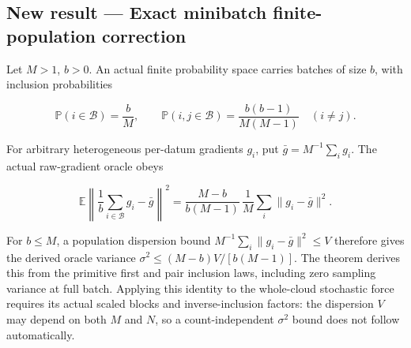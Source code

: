 \documentclass[11pt,a4paper]{report}
\begin{document}
\subsection{\texorpdfstring{New result — Exact minibatch finite-population correction}{New result — Exact minibatch finite-population correction}}



Let \(M>1\), \(b>0\). An actual finite probability space carries batches of size \(b\), with inclusion probabilities



\[\mathbb P(i\in\mathcal B)=\frac bM,\qquad\mathbb P(i,j\in\mathcal B)=\frac{b(b-1)}{M(M-1)}\quad(i\ne j).\]



For arbitrary heterogeneous per-datum gradients \(g_i\), put \(\bar g=M^{-1}\sum_i g_i\). The actual raw-gradient oracle obeys



\[\mathbb E\left\|\frac1b\sum_{i\in\mathcal B}g_i-\bar g\right\|^2=\frac{M-b}{b(M-1)}\,\frac1M\sum_i\|g_i-\bar g\|^2.\]



For \(b\le M\), a population dispersion bound \(M^{-1}\sum_i\|g_i-\bar g\|^2\le V\) therefore gives the derived oracle variance \(\sigma^2\le (M-b)V/[b(M-1)]\). The theorem derives this from the primitive first and pair inclusion laws, including zero sampling variance at full batch. Applying this identity to the whole-cloud stochastic force requires its actual scaled blocks and inverse-inclusion factors: the dispersion \(V\) may depend on both \(M\) and \(N\), so a count-independent \(\sigma^2\) bound does not follow automatically.
\end{document}
